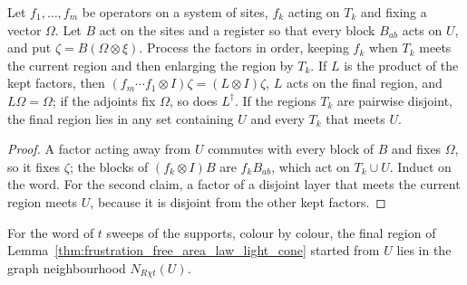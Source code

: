 \begin{lemma}
    \label{thm:frustration_free_area_law_light_cone}
    \leanok
    Let $f_1,\dots,f_m$ be operators on a system of sites, $f_k$ acting on
    $T_k$ and fixing a vector $\Omega$. Let $B$ act on the sites and a
    register so that every block $B_{ab}$ acts on $U$, and put
    $\zeta=B(\Omega\otimes\xi)$. Process the factors in order, keeping $f_k$
    when $T_k$ meets the current region and then enlarging the region by
    $T_k$. If $L$ is the product of the kept factors, then
    $(f_m\cdots f_1\otimes I)\zeta=(L\otimes I)\zeta$, $L$ acts on the final
    region, and $L\Omega=\Omega$; if the adjoints fix $\Omega$, so does
    $L^\dagger$. If the regions $T_k$ are pairwise disjoint, the final region
    lies in any set containing $U$ and every $T_k$ that meets $U$.
\end{lemma}

\begin{proof}\leanok
    A factor acting away from $U$ commutes with every block of $B$ and fixes
    $\Omega$, so it fixes $\zeta$; the blocks of $(f_k\otimes I)B$ are
    $f_kB_{ab}$, which act on $T_k\cup U$. Induct on the word. For the second
    claim, a factor of a disjoint layer that meets the current region meets
    $U$, because it is disjoint from the other kept factors.
\end{proof}

\begin{lemma}
    \label{thm:frustration_free_area_law_sweep_light_cone}
    \leanok
    For the word of $t$ sweeps of the supports, colour by colour, the final
    region of Lemma~\ref{thm:frustration_free_area_law_light_cone} started from $U$ lies in
    the graph neighbourhood $N_{R\chi t}(U)$.
\end{lemma}

